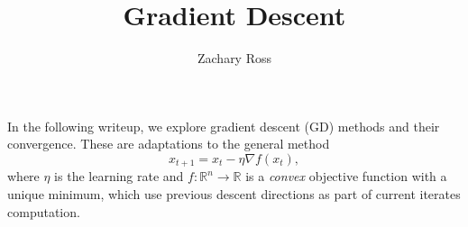 \documentclass{article}
\title{Gradient Descent}
\author{Zachary Ross}
\newcommand{\R}{\mathbb R}
\theoremstyle{definition}
\begin{document}
\maketitle

In the following writeup, we explore gradient descent (GD) methods
and their convergence. These are adaptations to the general method
\begin{equation}
    \label{eq:gd}
    x_{t + 1} = x_t - \eta \nabla f(x_t),
\end{equation} where $\eta$ is the learning rate and $f: \R^n \rightarrow \R$ is
a \emph{convex} objective function with a unique minimum, which use previous
descent directions as part of current iterates computation. 


\tableofcontents

\pagebreak







\end{document}
